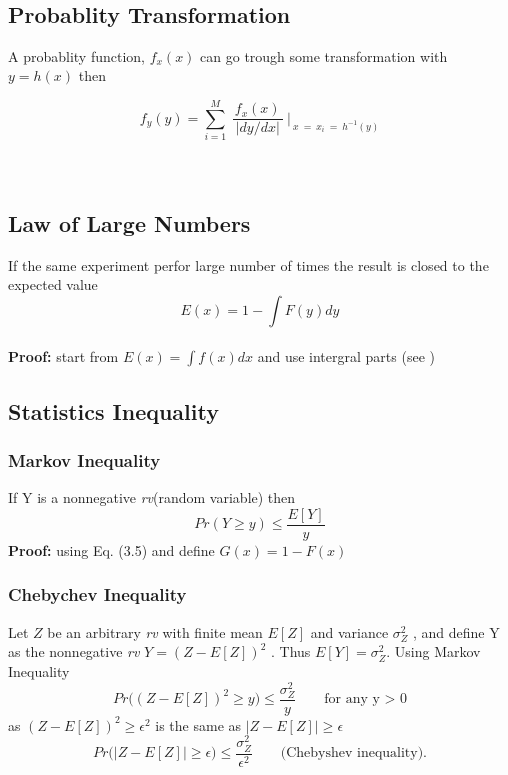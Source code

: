 ~\vspace{-2.5em}
\subsection{Probablity Transformation}
A probablity function, $f_x(x)$ can go trough some transformation with $y = h(x)$ then

\begin{equation}
f_y(y) = \sum_{i=1}^M ~\frac{f_x(x)}{~|dy/dx|~}~\biggr\rvert_{~x~=~x_i~=~h^{-1}(y)}
\end{equation}~\\~


\subsection{Law of Large Numbers}
If the same experiment perfor large number of times the result is closed to the expected value
\begin{equation}
E(x) = 1 - \int F(y) dy
\end{equation}
~\\\textbf{Proof:}
start from $E(x) = \int f(x) dx$ and use intergral parts (see  \cite{markov})
\subsection{Statistics Inequality}
\subsubsection{Markov Inequality}
If Y is a nonnegative \emph{rv}(random variable) then
$$Pr(Y \geq y) \leq \frac{E[Y]}{y}$$
\textbf{Proof:}
using Eq. (3.5) and define $G(x) = 1 - F(x)$
\subsubsection{Chebychev Inequality}
Let $Z$ be an arbitrary \emph{rv} with finite mean $E[Z]$ and variance $\sigma_Z^2$ , and define Y as the nonnegative \emph{rv} $Y = (Z - E [Z])^2$ . Thus $E [Y] = \sigma_Z^2$. Using Markov Inequality
~\\
$$ Pr\Big((Z-E[Z])^2 \geq y\Big) \leq \frac{\sigma_Z^2}{y} \hspace{2em} \text{for any y > 0}$$
as $ (Z-E[Z])^2 \geq \epsilon^2 $ is the same as $ |Z-E[Z]| \geq \epsilon $
$$ Pr\Big(|Z-E[Z]| \geq \epsilon\Big) \leq \frac{\sigma_Z^2}{\epsilon^2} \hspace{2em} \text{(Chebyshev inequality).}$$

